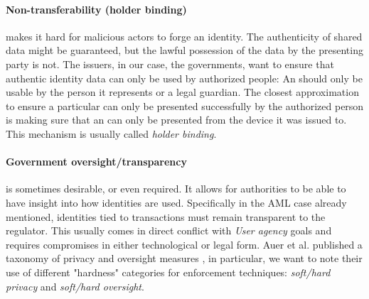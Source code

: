 \paragraph{Non-transferability (holder binding)} makes it hard for malicious actors to forge an identity.
The authenticity of shared data might be guaranteed, but the lawful possession of the data by the presenting party is not. The issuers, in our case, the governments, want to ensure that authentic identity data can only be used by authorized people: An \eid should only be usable by the person it represents or a legal guardian. The closest approximation to ensure a particular \eid can only be presented successfully by the authorized person is making sure that an \eid can only be presented from the device it was issued to. This mechanism is usually called \emph{holder binding}.

\paragraph{Government oversight/transparency} is sometimes desirable, or even required.
It allows for authorities to be able to have insight into how identities are used. Specifically in the AML case already mentioned, identities tied to transactions must remain transparent to the regulator. This usually comes in direct conflict with \emph{User agency} goals and requires compromises in either technological or legal form. Auer et al. published a taxonomy of privacy and oversight measures \cite{ABCD25}, in particular, we want to note their use of different "hardness" categories for enforcement techniques: \emph{soft/hard privacy} and \emph{soft/hard oversight}.
